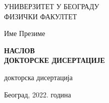 \thispagestyle{empty}

\begin{center}

\Large{
    УНИВЕРЗИТЕТ У БЕОГРАДУ \\
    ФИЗИЧКИ ФАКУЛТЕТ
}

\vspace{5.5cm}

\Large{
    Име Презиме
}

\vspace{.5cm}

\LARGE{ \textbf{
    НАСЛОВ \\
    ДОКТОРСКЕ ДИСЕРТАЦИЈЕ
}}

\vspace{.5cm}

\Large{
    докторска дисертација 
    
}
\vspace{9.1cm}
\Large{
    Београд, 2022. година
}
\end{center}

